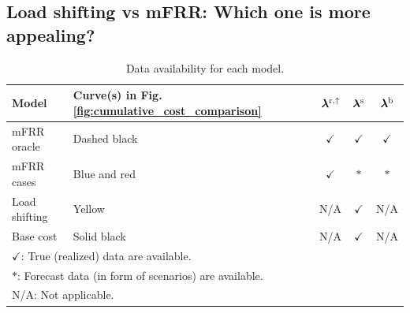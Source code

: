 \documentclass[11pt,a4paper]{article}
\begin{document}
\subsection{Load shifting vs mFRR: Which one is more appealing?}
%
\begin{table}[t]
    \caption{Data availability for each model.}
    \label{tab:price_visibility}
    \centering
    \begin{tabular}{llccc}
        \toprule
        Model         & Curve(s) in Fig. \ref{fig:cumulative_cost_comparison} & $\bm{\lambda}^{\rm{r},\uparrow}$ & $\bm{\lambda}^{\rm{s}}$ & $\bm{\lambda}^{\rm{b}}$ \\
        \midrule
        mFRR oracle   & Dashed black                                          & $\checkmark$                     & $\checkmark$            & $\checkmark$            \\
        mFRR cases    & Blue and red                                          & $\checkmark$                     & $\ast$                  & $\ast$                  \\
        Load shifting & Yellow                                                & N/A                              & $\checkmark$            & N/A                     \\
        Base cost     & Solid black                                           & N/A                              & $\checkmark$            & N/A                     \\
        \bottomrule
        \multicolumn{5}{l}{$\checkmark$: True (realized) data are available.}                                                                                        \\
        \multicolumn{5}{l}{$\ast$: Forecast data (in form of scenarios) are available.}                                                                              \\
        \multicolumn{5}{l}{N/A: Not applicable.}
    \end{tabular}
\end{table}
\end{document}
